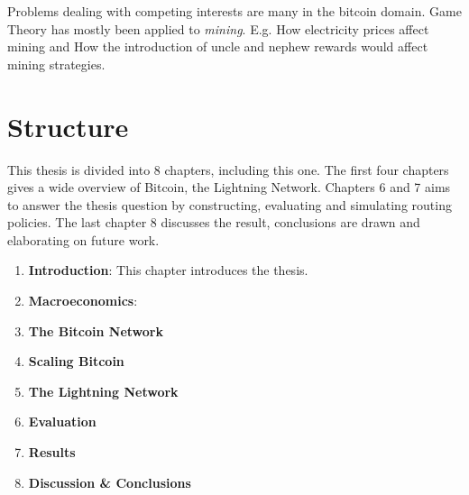 	Problems dealing with competing interests are many in the bitcoin domain. Game Theory has mostly been 
	applied to \textit{mining}. E.g. How electricity prices affect mining\cite{singh:dwivedi:strivastava:energy:consumption:mining} and How the introduction of uncle and 
	nephew rewards would affect mining strategies\cite{niu:feng:selfish:mining:ethereum}.
	
	
\section{Structure}

This thesis is divided into 8 chapters, including this one. The first four chapters gives a wide overview of Bitcoin, the Lightning Network. Chapters 6 and 7 aims to answer the thesis question by constructing, evaluating and simulating routing policies. The last chapter 8 discusses the result,  conclusions are drawn and elaborating on future work.

\begin{enumerate}
	\item \textbf{Introduction}: This chapter introduces the thesis.
	\item \textbf{Macroeconomics}:
	\item \textbf{The Bitcoin Network}
	\item \textbf{Scaling Bitcoin}
	\item \textbf{The Lightning Network}
	\item \textbf{Evaluation}
	\item \textbf{Results}
	\item \textbf{Discussion \& Conclusions}
\end{enumerate}